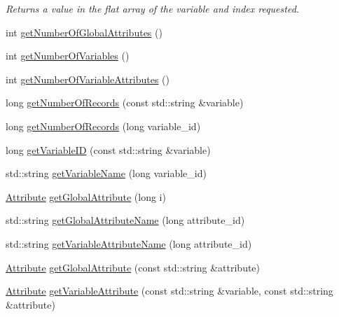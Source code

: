 \begin{DoxyCompactItemize}
\begin{DoxyCompactList}\small\item\em Returns a value in the flat array of the variable and index requested. \end{DoxyCompactList}\item 
int \hyperlink{classccmc_1_1_c_d_f_file_reader_a881308df42ee5d273cb7364152f6970d}{get\-Number\-Of\-Global\-Attributes} ()
\item 
int \hyperlink{classccmc_1_1_c_d_f_file_reader_ae463cfe808dec21748a908b080c8bf81}{get\-Number\-Of\-Variables} ()
\item 
int \hyperlink{classccmc_1_1_c_d_f_file_reader_aeafab3428b6ca81a9142faee44b3069f}{get\-Number\-Of\-Variable\-Attributes} ()
\item 
long \hyperlink{classccmc_1_1_c_d_f_file_reader_adc8d27cd794641171674307330ebdc66}{get\-Number\-Of\-Records} (const std\-::string \&variable)
\item 
long \hyperlink{classccmc_1_1_c_d_f_file_reader_a97f59c4e9020eb48fa460ba74b9d2535}{get\-Number\-Of\-Records} (long variable\-\_\-id)
\item 
long \hyperlink{classccmc_1_1_c_d_f_file_reader_a7c6c138eb96e5562e3a17b1691208129}{get\-Variable\-I\-D} (const std\-::string \&variable)
\item 
std\-::string \hyperlink{classccmc_1_1_c_d_f_file_reader_a98ab0f21eb5bad8b9fc095d8c1347e24}{get\-Variable\-Name} (long variable\-\_\-id)
\item 
\hyperlink{classccmc_1_1_attribute}{Attribute} \hyperlink{classccmc_1_1_c_d_f_file_reader_af7d28ab77cd25e50fcf0c1a55908331a}{get\-Global\-Attribute} (long i)
\item 
std\-::string \hyperlink{classccmc_1_1_c_d_f_file_reader_a6e6e6be5271219f6a2a45c94c89630f7}{get\-Global\-Attribute\-Name} (long attribute\-\_\-id)
\item 
std\-::string \hyperlink{classccmc_1_1_c_d_f_file_reader_adc190bdf05f4d01b465a0ff314431ebb}{get\-Variable\-Attribute\-Name} (long attribute\-\_\-id)
\item 
\hyperlink{classccmc_1_1_attribute}{Attribute} \hyperlink{classccmc_1_1_c_d_f_file_reader_aeaffff44fdcad36ae26cd7b84ba39a61}{get\-Global\-Attribute} (const std\-::string \&attribute)
\item 
\hyperlink{classccmc_1_1_attribute}{Attribute} \hyperlink{classccmc_1_1_c_d_f_file_reader_ad90a8f0f842e2dd8091c5883add375a6}{get\-Variable\-Attribute} (const std\-::string \&variable, const std\-::string \&attribute)
\item 

\end{DoxyCompactItemize}
